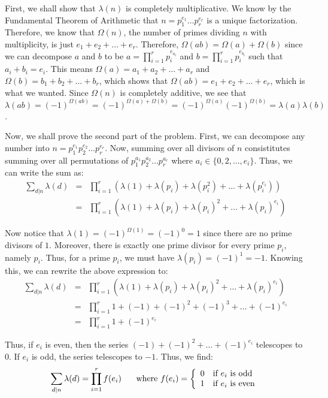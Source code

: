 \documentclass[psamsfonts]{amsart}
\newenvironment{sol}{{\bfseries Solution}}{\qedsymbol}
\theoremstyle{definition}
\theoremstyle{remark}
\numberwithin{equation}{section}
\begin{document}
\begin{sol}
First, we shall show that $\lambda(n)$ is completely multiplicative. We know by the Fundamental Theorem of Arithmetic that $n = p_1^{e_1} \ldots p_r^{e_r}$ is a unique factorization. Therefore, we know that $\Omega(n)$, the number of primes dividing $n$ with multiplicity, is just $e_1 + e_2 + \ldots + e_r$. Therefore, $\Omega(ab) = \Omega(a) + \Omega(b)$ since we can decompose $a$ and $b$ to be $a = \prod_{i=1}^{r} p_i^{e_{a_i}}$ and $b = \prod_{i=1}^{r} p_i^{e_{b_i}}$ such that $a_i + b_i = e_i$. This means $\Omega(a) = a_1 + a_2 + \ldots + a_r$ and $\Omega(b) = b_1 + b_2 + \ldots + b_r$, which shows that $\Omega(ab) = e_1 + e_2 + \ldots + e_r$, which is what we wanted. Since $\Omega(n)$ is completely additive, we see that $\lambda(ab) = (-1)^{\Omega(ab)} = (-1)^{\Omega(a) + \Omega(b)} = (-1)^{\Omega(a)} (-1)^{\Omega(b)} = \lambda(a) \lambda(b)$. 

Now, we shall prove the second part of the problem. First, we can decompose any number into $n = p_1^{e_1} p_2^{e_2} \ldots p_r^{e_r}$. Now, summing over all divisors of $n$ consistitutes summing over all permutations of $p_1^{a_1} p_2^{a_2} \ldots p_r^{a_r}$ where $a_i \in \{0, 2, \ldots, e_i \}$. Thus, we can write the sum as:
\begin{eqnarray}
\sum_{d|n} \lambda(d) &=& \prod_{i=1}^{r} \left( \lambda(1) + \lambda(p_i) + \lambda(p_i^2) + \ldots + \lambda(p_i^{e_i}) \right) \\
&=& \prod_{i=1}^{r} \left( \lambda(1) + \lambda(p_i) + \lambda(p_i)^2 + \ldots + \lambda(p_i)^{e_i} \right)
\end{eqnarray}

Now notice that $\lambda(1) = (-1)^{\Omega(1)} = (-1)^{0} = 1$ since there are no prime divisors of $1$. Moreover, there is exactly one prime divisor for every prime $p_i$, namely $p_i$. Thus, for a prime $p_i$, we must have $\lambda(p_i) = (-1)^{1} = -1$. Knowing this, we can rewrite the above expression to:
\begin{eqnarray}
\sum_{d|n} \lambda(d) &=& \prod_{i=1}^{r} \left( \lambda(1) + \lambda(p_i) + \lambda(p_i)^2 + \ldots + \lambda(p_i)^{e_i} \right) \\
&=& \prod_{i=1}^{r} 1 + (-1) + (-1)^2 + (- 1)^3 + \ldots + (-1)^{e_i} \\ 
&=& \prod_{i=1}^{r} 1 + (-1)^{e_i}
\end{eqnarray}

Thus, if $e_i$ is even, then the series $(-1) + (-1)^2 + \ldots + (-1)^{e_i}$ telescopes to 0. If $e_i$ is odd, the series telescopes to $-1$. Thus, we find:
\begin{equation}
\sum_{d|n} \lambda(d) = \prod_{i=1}^r f(e_i) \hspace{0.5cm} \textrm{ where } f(e_i) = \left\{ \begin{array}{l l}
0 & \textrm{if } e_i \textrm{ is odd} \\
1 & \textrm{if } e_i \textrm{ is even} 
\end{array} \right.
\end{equation}


\end{sol}
\end{document}
